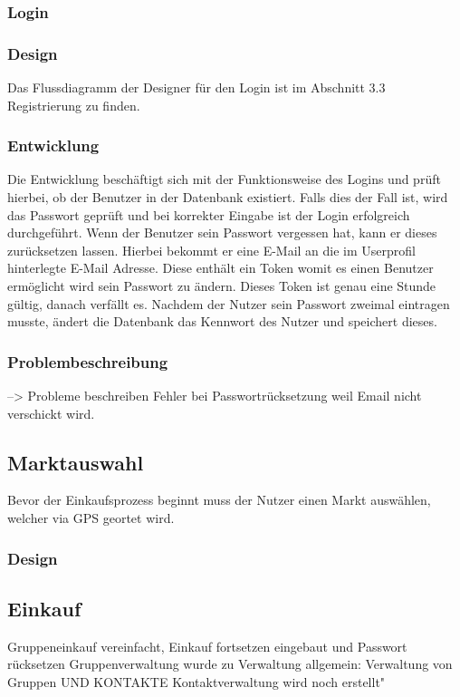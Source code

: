\documentclass[12pt,a4paper]{article}
\begin{document}
\subsubsection{Login}
\subsubsection*{Design}
Das Flussdiagramm der Designer für den Login ist im Abschnitt 3.3 Registrierung zu finden. 
\subsubsection*{Entwicklung}
Die Entwicklung beschäftigt sich mit der Funktionsweise des Logins und prüft hierbei, ob der Benutzer in der Datenbank existiert. Falls dies der Fall ist, wird das Passwort geprüft und bei korrekter Eingabe ist der Login erfolgreich durchgeführt.
Wenn der Benutzer sein Passwort vergessen hat, kann er dieses zurücksetzen lassen. Hierbei bekommt er eine E-Mail an die im Userprofil hinterlegte E-Mail Adresse. Diese enthält ein Token womit es einen Benutzer ermöglicht wird sein Passwort zu ändern. Dieses Token ist genau eine Stunde gültig, danach verfällt es. 
Nachdem der Nutzer sein Passwort zweimal eintragen musste, ändert die Datenbank das Kennwort des Nutzer und speichert dieses.
\subsubsection*{Problembeschreibung} --> Probleme beschreiben
Fehler bei Passwortrücksetzung weil Email nicht verschickt wird.
\newpage

\subsection{Marktauswahl}
Bevor der Einkaufsprozess beginnt muss der Nutzer einen Markt auswählen, welcher via GPS geortet wird. 
\subsubsection*{Design}


\subsection{Einkauf}
Gruppeneinkauf vereinfacht, Einkauf fortsetzen eingebaut und Passwort rücksetzen
Gruppenverwaltung wurde zu Verwaltung allgemein:  Verwaltung von Gruppen UND KONTAKTE 
Kontaktverwaltung wird noch erstellt"
\end{document}
